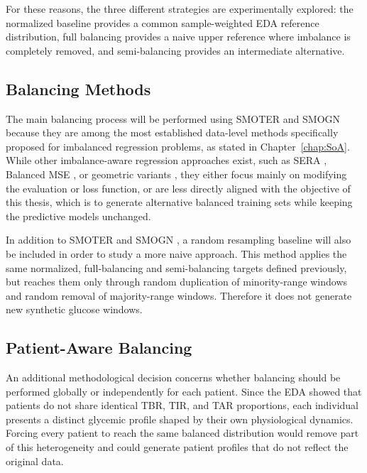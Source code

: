 For these reasons, the three different strategies are experimentally explored: the normalized baseline provides a common sample-weighted EDA reference distribution, full balancing provides a naive upper reference where imbalance is completely removed, and semi-balancing provides an intermediate alternative.

\subsection{Balancing Methods}
\label{subsec:experimental_methodology_methods}

The main balancing process will be performed using SMOTER \cite{10.1007/978-3-642-40669-0_33} and SMOGN \cite{pmlr-v74-branco17a} because they are among the most established data-level methods specifically proposed for imbalanced regression problems, as stated in Chapter~\ref{chap:SoA}. While other imbalance-aware regression approaches exist, such as SERA \cite{5178874}, Balanced MSE \cite{Ren_2022_CVPR}, or geometric variants \cite{CAMACHO2022116387}, they either focus mainly on modifying the evaluation or loss function, or are less directly aligned with the objective of this thesis, which is to generate alternative balanced training sets while keeping the predictive models unchanged.

In addition to SMOTER \cite{10.1007/978-3-642-40669-0_33} and SMOGN \cite{pmlr-v74-branco17a}, a random resampling baseline will also be included in order to study a more naive approach. This method applies the same normalized, full-balancing and semi-balancing targets defined previously, but reaches them only through random duplication of minority-range windows and random removal of majority-range windows. Therefore it does not generate new synthetic glucose windows.

\subsection{Patient-Aware Balancing}
\label{subsec:experimental_methodology_patient_aware}

An additional methodological decision concerns whether balancing should be performed globally or independently for each patient. Since the EDA showed that patients do not share identical TBR, TIR, and TAR proportions, each individual presents a distinct glycemic profile shaped by their own physiological dynamics. Forcing every patient to reach the same balanced distribution would remove part of this heterogeneity and could generate patient profiles that do not reflect the original data.

